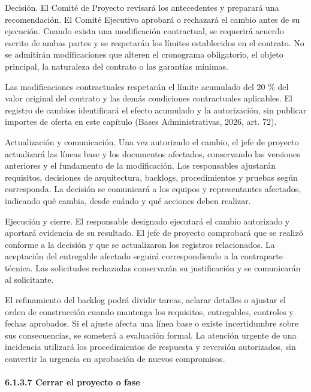\documentclass[11pt]{article}
\begin{document}
Decisión. El Comité de Proyecto revisará los antecedentes y preparará
una recomendación. El Comité Ejecutivo aprobará o rechazará el cambio
antes de su ejecución. Cuando exista una modificación contractual, se
requerirá acuerdo escrito de ambas partes y se respetarán los límites
establecidos en el contrato. No se admitirán modificaciones que alteren
el cronograma obligatorio, el objeto principal, la naturaleza del
contrato o las garantías mínimas.

Las modificaciones contractuales respetarán el límite acumulado del 20
\% del valor original del contrato y las demás condiciones contractuales
aplicables. El registro de cambios identificará el efecto acumulado y la
autorización, sin publicar importes de oferta en este capítulo (Bases
Administrativas, 2026, art. 72).

Actualización y comunicación. Una vez autorizado el cambio, el jefe de
proyecto actualizará las líneas base y los documentos afectados,
conservando las versiones anteriores y el fundamento de la modificación.
Los responsables ajustarán requisitos, decisiones de arquitectura,
backlogs, procedimientos y pruebas según corresponda. La decisión se
comunicará a los equipos y representantes afectados, indicando qué
cambia, desde cuándo y qué acciones deben realizar.

Ejecución y cierre. El responsable designado ejecutará el cambio
autorizado y aportará evidencia de su resultado. El jefe de proyecto
comprobará que se realizó conforme a la decisión y que se actualizaron
los registros relacionados. La aceptación del entregable afectado
seguirá correspondiendo a la contraparte técnica. Las solicitudes
rechazadas conservarán su justificación y se comunicarán al solicitante.

El refinamiento del backlog podrá dividir tareas, aclarar detalles o
ajustar el orden de construcción cuando mantenga los requisitos,
entregables, controles y fechas aprobados. Si el ajuste afecta una línea
base o existe incertidumbre sobre sus consecuencias, se someterá a
evaluación formal. La atención urgente de una incidencia utilizará los
procedimientos de respuesta y reversión autorizados, sin convertir la
urgencia en aprobación de nuevos compromisos.

\paragraph{6.1.3.7 Cerrar el proyecto o fase}\label{6-1-3-7-cerrar-el-proyecto-o-fase}
\end{document}
